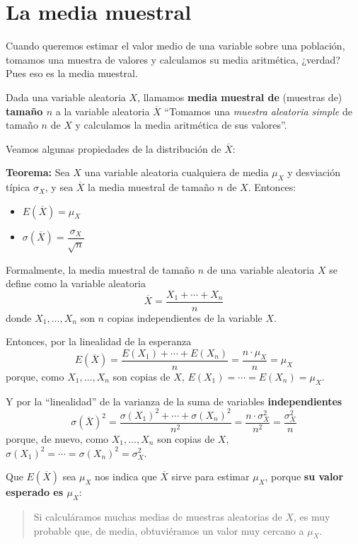 \documentclass[
  spanish,
  letterpaper,
  DIV=11,
  numbers=noendperiod]{scrreprt}
\begin{document}
\section{La media muestral}\label{la-media-muestral}

Cuando queremos estimar el valor medio de una variable sobre una
población, tomamos una muestra de valores y calculamos su media
aritmética, ¿verdad? Pues eso es la media muestral.

Dada una variable aleatoria \(X\), llamamos \textbf{media muestral de}
(muestras de) \textbf{tamaño \(n\)} a la variable aleatoria
\(\overline{X}\) ``Tomamos una \emph{muestra aleatoria simple} de tamaño
\(n\) de \(X\) y calculamos la media aritmética de sus valores''.

Veamos algunas propiedades de la distribución de \(\overline{X}\):

\textbf{Teorema:} Sea \(X\) una variable aleatoria cualquiera de media
\(\mu_X\) y desviación típica \(\sigma_X\), y sea \(\overline{X}\) la
media muestral de tamaño \(n\) de \(X\). Entonces:

\begin{itemize}
\item
  \(E(\overline{X})=\mu_X\)
\item
  \(\sigma(\overline{X})=\dfrac{\sigma_X}{\sqrt{n}}\)
\end{itemize}

Formalmente, la media muestral de tamaño \(n\) de una variable aleatoria
\(X\) se define como la variable aleatoria \[
\overline{X}=\frac{X_1+\cdots+X_n}{n}
\] donde \(X_1,\ldots,X_n\) son \(n\) copias independientes de la
variable \(X\).

Entonces, por la linealidad de la esperanza \[
  E(\overline{X})=\frac{E(X_1)+\cdots+E(X_n)}{n}=\frac{n\cdot \mu_X}{n}=\mu_X
\] porque, como \(X_1,\ldots,X_n\) son copias de \(X\),
\(E(X_1)=\cdots=E(X_n)=\mu_X\).

Y por la ``linealidad'' de la varianza de la suma de variables
\textbf{independientes} \[
\sigma(\overline{X})^2=\frac{\sigma(X_1)^2+\cdots+\sigma(X_n)^2}{n^2}=\frac{n\cdot \sigma_X^2}{n^2}=\frac{\sigma_X^2}{n}
\] porque, de nuevo, como \(X_1,\ldots,X_n\) son copias de \(X\),
\(\sigma(X_1)^2=\cdots=\sigma(X_n)^2=\sigma_X^2\).

Que \(E(\overline{X})\) sea \(\mu_X\) nos indica que \(\overline{X}\)
sirve para estimar \(\mu_X\), porque \textbf{su valor esperado es
\(\mu_X\)}:

\begin{quote}
Si calculáramos muchas medias de muestras aleatorias de \(X\), es muy
probable que, de media, obtuviéramos un valor muy cercano a \(\mu_X\).
\end{quote}
\end{document}
